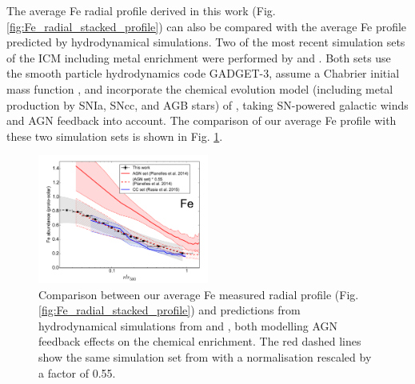 \documentclass{aa}
\begin{document}
The average Fe radial profile derived in this work (Fig. \ref{fig:Fe_radial_stacked_profile}) can also be compared with the average Fe profile predicted by hydrodynamical simulations. Two of the most recent simulation sets of the ICM including metal enrichment were performed by \citet{2014MNRAS.438..195P} and \citet{2015ApJ...813L..17R}. Both sets use the smooth particle hydrodynamics code GADGET-3, assume a Chabrier initial mass function \citep[IMF;][]{2003PASP..115..763C}, and incorporate the chemical evolution model (including metal production by SNIa, SNcc, and AGB stars) of \citet{2007MNRAS.382.1050T}, taking SN-powered galactic winds and AGN feedback into account. The comparison of our average Fe profile with these two simulation sets is shown in Fig. \ref{fig:Fe_profiles_simulations}. 


\begin{figure}[!]

                \includegraphics[width=0.5\textwidth]{fig_radial_stacked_Fe_simulations.pdf}

        \caption{Comparison between our average Fe measured radial profile (Fig. \ref{fig:Fe_radial_stacked_profile}) and predictions from hydrodynamical simulations from \citet[][solid red lines]{2014MNRAS.438..195P} and \citet[][solid blue lines]{2015ApJ...813L..17R}, both modelling AGN feedback effects on the chemical enrichment. The red dashed lines show the same simulation set from \citet[][]{2014MNRAS.438..195P} with a normalisation rescaled by a factor of 0.55.}
\label{fig:Fe_profiles_simulations}
\end{figure}
\end{document}
